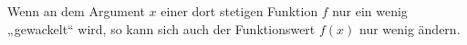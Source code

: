 Wenn an dem Argument $x$ einer dort stetigen Funktion $f$ nur ein wenig „gewackelt“ wird, so kann sich auch der Funktionswert $f(x)$ nur wenig ändern.
